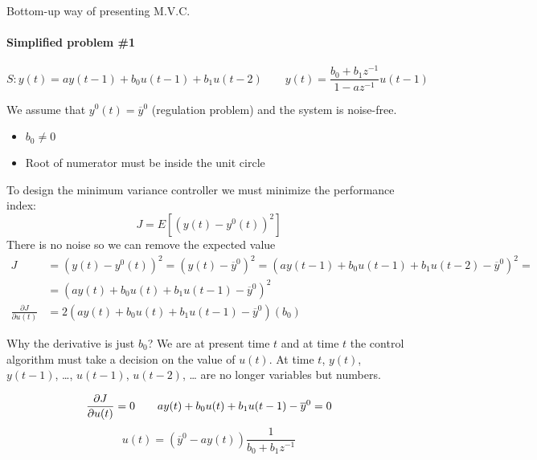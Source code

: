 Bottom-up way of presenting M.V.C.

\paragraph{Simplified problem \#1}
\[
    S: y(t) = ay(t-1) + b_0u(t-1) + b_1u(t-2) \qquad y(t) = \frac{b_0+b_1z^{-1}}{1-az^{-1}}u(t-1)
\]

We assume that $y^0(t)=\overline{y}^0$ (regulation problem) and the system is noise-free.
\begin{itemize}
    \item $b_0\ne 0$
    \item Root of numerator must be inside the unit circle
\end{itemize}

To design the minimum variance controller we must minimize the performance index:
\[
    J = E\left[ (y(t) - y^0(t))^2 \right]
\]
There is no noise so we can remove the expected value
\begin{align*}
    J &= \left( y(t) - y^0(t) \right)^2 = \left( y(t) - \overline{y}^0 \right)^2 = \left( ay(t-1)+b_0u(t-1)+b_1u(t-2) - \overline{y}^0 \right)^2 = \\
    &= \left( ay(t) + b_0u(t) + b_1u(t-1)-\overline{y}^0 \right)^2 \\
    \frac{\partial J}{\partial u(t)} &= 2\left( ay(t)+b_0u(t)+b_1u(t-1)-\overline{y}^0 \right)\left(b_0\right)
\end{align*}

Why the derivative is just $b_0$? We are at present time $t$ and at time $t$ the control algorithm must take a decision on the value of $u(t)$.
At time $t$, $y(t)$, $y(t-1)$, \dots, $u(t-1)$, $u(t-2)$, \dots{} are no longer variables but numbers.

\[
    \frac{\partial J}{\partial u(t)} = 0 \qquad ay(t)+b_0u(t)+b_1u(t-1)-\overline{y}^0 = 0 \\
\]
\[
    u(t) = \left( \overline{y}^0  - ay(t)\right)\frac{1}{b_0+b_1z^{-1}}
\]
\begin{figure}[H]
    \centering
\end{figure}

